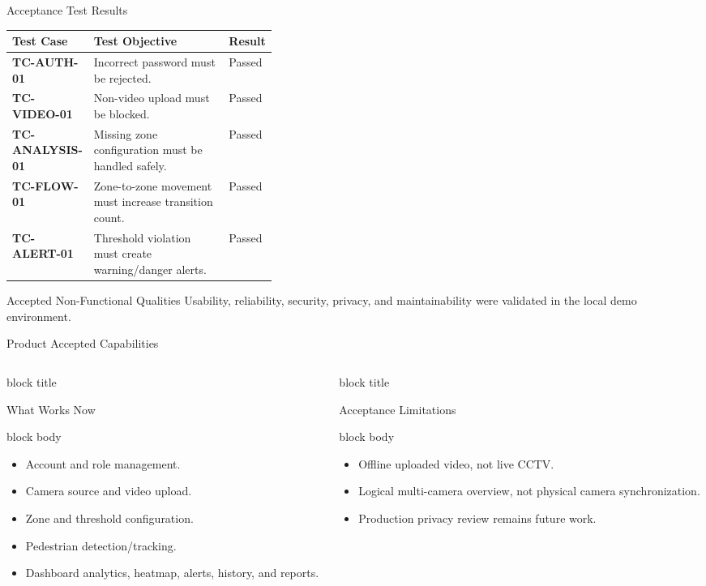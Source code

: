 \documentclass[aspectratio=169,10pt]{beamer}
\newcommand{\tightlist}{\setlength{\itemsep}{0.18em}\setlength{\parskip}{0pt}}
\newcommand{\fixedblock}[3]{%
    \begin{beamercolorbox}[wd=\linewidth,sep=0.45em]{block title}
        \begin{minipage}[c][0.82cm][c]{\dimexpr\linewidth-0.9em\relax}
            \raggedright\usebeamerfont{block title}#1
        \end{minipage}
    \end{beamercolorbox}
    \begin{beamercolorbox}[wd=\linewidth,sep=0.55em]{block body}
        \begin{minipage}[c][#2][c]{\dimexpr\linewidth-1.1em\relax}
            \raggedright #3
        \end{minipage}
    \end{beamercolorbox}
}
\begin{document}
\begin{frame}{Acceptance Test Results}
    \small
    \begin{tabularx}{\linewidth}{>{\bfseries}p{0.22\linewidth}X>{\centering\arraybackslash}p{0.16\linewidth}}
        \toprule
        Test Case & Test Objective & Result \\
        \midrule
        TC-AUTH-01 & Incorrect password must be rejected. & Passed \\
        TC-VIDEO-01 & Non-video upload must be blocked. & Passed \\
        TC-ANALYSIS-01 & Missing zone configuration must be handled safely. & Passed \\
        TC-FLOW-01 & Zone-to-zone movement must increase transition count. & Passed \\
        TC-ALERT-01 & Threshold violation must create warning/danger alerts. & Passed \\
        \bottomrule
    \end{tabularx}
    \vspace{0.7em}
    \begin{block}{Accepted Non-Functional Qualities}
        Usability, reliability, security, privacy, and maintainability were validated in the local demo environment.
    \end{block}
\end{frame}

\begin{frame}{Product Accepted Capabilities}
    \begin{columns}[T,onlytextwidth]
        \begin{column}{0.48\textwidth}
            \fixedblock{What Works Now}{0.50\textheight}{
                \begin{itemize}\tightlist
                    \item Account and role management.
                    \item Camera source and video upload.
                    \item Zone and threshold configuration.
                    \item Pedestrian detection/tracking.
                    \item Dashboard analytics, heatmap, alerts, history, and reports.
                \end{itemize}
            }
        \end{column}
        \begin{column}{0.48\textwidth}
            \fixedblock{Acceptance Limitations}{0.50\textheight}{
                \begin{itemize}\tightlist
                    \item Offline uploaded video, not live CCTV.
                    \item Logical multi-camera overview, not physical camera synchronization.
                    \item Production privacy review remains future work.
                \end{itemize}
            }
        \end{column}
    \end{columns}
\end{frame}
\end{document}
